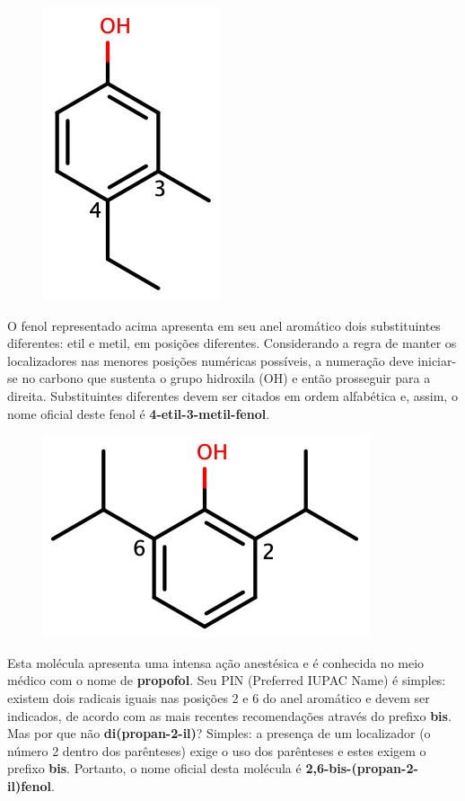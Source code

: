 \begin{tcolorbox}[colback=white!5!white,colframe=orange!90!black,title=\textbf{Exemplo 8}]
	\begin{figure}[h]
		\centering
		\includegraphics[width=0.25\linewidth]{imagens/etilmetil.png}
		\label{fig:2metilhex}
	\end{figure}
	\tcblower
	O fenol representado acima apresenta em seu anel aromático dois substituintes diferentes: etil e metil, em posições diferentes. Considerando a regra de manter os localizadores nas menores posições numéricas possíveis, a numeração deve iniciar-se no carbono que sustenta o grupo hidroxila (OH) e então prosseguir para a direita. Substituintes diferentes devem ser citados em ordem alfabética e, assim, o nome oficial deste fenol é \textbf{4-etil-3-metil-fenol}.
\end{tcolorbox}

\begin{tcolorbox}[colback=white!5!white,colframe=orange!90!black,title=\textbf{Exemplo 9}]
	\begin{figure}[ht]
		\centering
		\includegraphics[width=0.5\linewidth]{imagens/propofol.png}
		\label{fig:propofol}
	\end{figure}
	\tcblower
	Esta molécula apresenta uma intensa ação anestésica e é conhecida no meio médico com o nome de \textbf{propofol}. Seu PIN (Preferred IUPAC Name) é simples: existem dois radicais iguais nas posições 2 e 6 do anel aromático e devem ser indicados, de acordo com as mais recentes recomendações através do prefixo \textbf{bis}. Mas por que não \textbf{di(propan-2-il)}? Simples: a presença de um localizador (o número 2 dentro dos parênteses) exige o uso dos parênteses e estes exigem o prefixo \textbf{bis}. Portanto, o nome oficial desta molécula é \textbf{2,6-bis-(propan-2-il)fenol}.
\end{tcolorbox}



